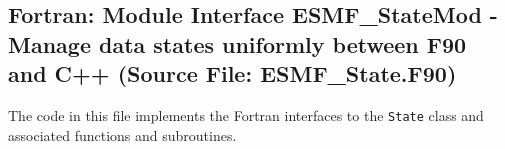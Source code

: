  
\parskip        0pt
\parindent      0pt
\baselineskip  11pt
 
\def\bv{\begin{verbatim}}
\def\ev{\end{verbatim}}
\def\be{\begin{equation}}
\def\ee{\end{equation}}
\def\bea{\begin{eqnarray}}
\def\eea{\end{eqnarray}}
\def\bi{\begin{itemize}}
\def\ei{\end{itemize}}
\def\bn{\begin{enumerate}}
\def\en{\end{enumerate}}
\def\bd{\begin{description}}
\def\ed{\end{description}}
\def\({\left (}
\def\){\right )}
\def\[{\left [}
\def\]{\right ]}
\def\<{\left  \langle}
\def\>{\right \rangle}
\def\cI{{\cal I}}
\def\diag{\mathop{\rm diag}}
\def\tr{\mathop{\rm tr}}


 
\subsection{Fortran:  Module Interface ESMF\_StateMod - Manage data states uniformly between F90 and C++  (Source File: ESMF\_State.F90)}


  
  
   The code in this file implements the Fortran interfaces to the
   {\tt State} class and associated functions and subroutines.  
  
